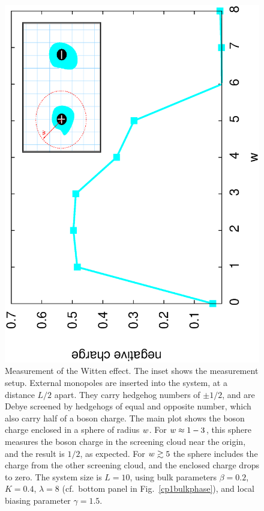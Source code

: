 \begin{figure}
\includegraphics[angle=-90,width=\linewidth]{figures/wittenout.eps}
\caption{Measurement of the Witten effect. The inset shows the measurement setup. External monopoles are inserted into the system, at a distance $L/2$ apart. They carry hedgehog numbers of $\pm 1/2$, and are Debye screened by hedgehogs of equal and opposite number, which also carry half of a boson charge. The main plot shows the boson charge enclosed in a sphere of radius $\scripty{r}$. For $\scripty{r}\approx 1-3$, this sphere measures the boson charge in the screening cloud near the origin, and the result is $1/2$, as expected. For $\scripty{r}\gtrsim 5$ the sphere includes the charge from the other screening cloud, and the enclosed charge drops to zero. The system size is $L=10$, using bulk parameters $\beta=0.2$, $K=0.4$, $\lambda=8$ (cf.\ bottom panel in Fig.~\ref{cp1bulkphase}), and local biasing parameter $\gamma=1.5$.}
\label{witten}
\end{figure}

